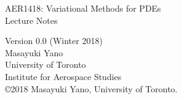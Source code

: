 \begin{center}
  \phantom{.}

  \vspace{20ex}
  \begin{huge}
    AER1418: Variational Methods for PDEs \\[2ex]
    Lecture Notes \\[2ex]
  \end{huge}

  \begin{large}
    Version 0.0 (Winter 2018) \\[5ex]
    Masayuki Yano \\[2ex]
    University of Toronto \\
    Institute for Aerospace Studies \\[2ex]
    \copyright2018 Masayuki Yano, University of Toronto.
  \end{large}
  

\end{center}


